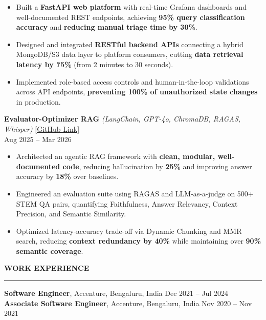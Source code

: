 \documentclass[letterpaper,10.5pt]{extarticle}
\newcommand{\resumesection}[1]{%
    \vspace{6pt}%
    \noindent\textbf{#1}\vspace{-5pt}%
    \\\noindent\rule{\textwidth}{0.5pt}%
    \vspace{1pt}%
}
\begin{document}
\begin{itemize}[leftmargin=12pt, topsep=1pt, itemsep=0pt, parsep=0pt]
    \item Built a \textbf{FastAPI web platform} with real-time Grafana dashboards and well-documented REST endpoints, achieving \textbf{95\% query classification accuracy} and \textbf{reducing manual triage time by 30\%}.
    \item Designed and integrated \textbf{RESTful backend APIs} connecting a hybrid MongoDB/S3 data layer to platform consumers, cutting \textbf{data retrieval latency by 75\%} (from 2 minutes to 30 seconds).
    \item Implemented role-based access controls and human-in-the-loop validations across API endpoints, \textbf{preventing 100\% of unauthorized state changes} in production.
\end{itemize}

\vspace{4pt}

\noindent\textbf{Evaluator-Optimizer RAG}
\textit{(LangChain, GPT-4o, ChromaDB, RAGAS, Whisper)} \hfill \href{https://github.com/slowloris-98/Evaluator-Optimizer-RAG}{[GitHub Link]} \\
Aug 2025 -- Mar 2026

\begin{itemize}[leftmargin=12pt, topsep=1pt, itemsep=0pt, parsep=0pt]
    \item Architected an agentic RAG framework with \textbf{clean, modular, well-documented code}, reducing hallucination by \textbf{25\%} and improving answer accuracy by \textbf{18\%} over baselines.
    \item Engineered an evaluation suite using RAGAS and LLM-as-a-judge on 500+ STEM QA pairs, quantifying Faithfulness, Answer Relevancy, Context Precision, and Semantic Similarity.
    \item Optimized latency-accuracy trade-off via Dynamic Chunking and MMR search, reducing \textbf{context redundancy by 40\%} while maintaining over \textbf{90\% semantic coverage}.
\end{itemize}

\resumesection{WORK EXPERIENCE}

\noindent\textbf{Software Engineer}, Accenture, Bengaluru, India \hfill Dec 2021 -- Jul 2024\\
\textbf{Associate Software Engineer}, Accenture, Bengaluru, India \hfill Nov 2020 -- Nov 2021
\end{document}

